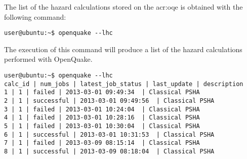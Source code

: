 The list of the hazard calculations stored on the \gls{acr:oqe} is 
obtained with the following command:
\begin{Verbatim}[frame=single, commandchars=\\\{\}, fontsize=\small]
user@ubuntu:~$ openquake --lhc
\end{Verbatim}
The execution of this command will produce a list of the hazard 
calculations performed with OpenQuake.
\begin{Verbatim}[frame=single, commandchars=\\\{\}, fontsize=\small]
user@ubuntu:~$ openquake --lhc
calc_id | num_jobs | latest_job_status | last_update | description
1 | 1 | failed | 2013-03-01 09:49:34  | Classical PSHA
2 | 1 | successful | 2013-03-01 09:49:56  | Classical PSHA
3 | 1 | failed | 2013-03-01 10:24:04  | Classical PSHA
4 | 1 | failed | 2013-03-01 10:28:16  | Classical PSHA
5 | 1 | failed | 2013-03-01 10:30:04  | Classical PSHA
6 | 1 | successful | 2013-03-01 10:31:53  | Classical PSHA
7 | 1 | failed | 2013-03-09 08:15:14  | Classical PSHA
8 | 1 | successful | 2013-03-09 08:18:04  | Classical PSHA
\end{Verbatim}

\clearpage


